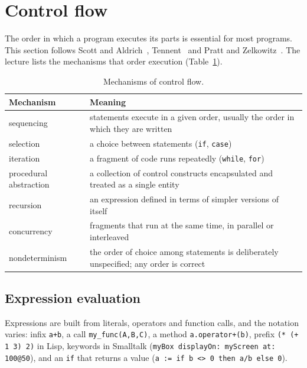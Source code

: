 \section{Control flow}
\label{sec:control}

The order in which a program executes its parts is essential for most
programs. This section follows Scott and Aldrich~\cite[Ch.~6]{scott2025pragmatics},
Tennent~\cite[Ch.~6]{tennent1981principles} and Pratt and
Zelkowitz~\cite[Ch.~6]{pratt2001design}. The lecture lists the mechanisms
that order execution (Table~\ref{tab:control-kinds}).

\begin{table}[h]
\centering
\small
\begin{tabular}{l p{}}
  \toprule
  Mechanism & Meaning \\
  \midrule
  sequencing & statements execute in a given order, usually the order in which they are written \\
  selection & a choice between statements (\texttt{if}, \texttt{case}) \\
  iteration & a fragment of code runs repeatedly (\texttt{while}, \texttt{for}) \\
  procedural abstraction & a collection of control constructs encapsulated and treated as a single entity \\
  recursion & an expression defined in terms of simpler versions of itself \\
  concurrency & fragments that run at the same time, in parallel or interleaved \\
  nondeterminism & the order of choice among statements is deliberately unspecified; any order is correct \\
  \bottomrule
\end{tabular}
\caption{Mechanisms of control flow.}
\label{tab:control-kinds}
\end{table}

\subsection{Expression evaluation}

Expressions are built from literals, operators and function calls, and the
notation varies: infix \texttt{a+b}, a call \texttt{my\_func(A,B,C)}, a method
\texttt{a.operator+(b)}, prefix \texttt{(* (+ 1 3) 2)} in Lisp, keywords in
Smalltalk (\texttt{myBox displayOn: myScreen at: 100@50}), and an \texttt{if}
that returns a value (\texttt{a := if b <> 0 then a/b else 0}).

